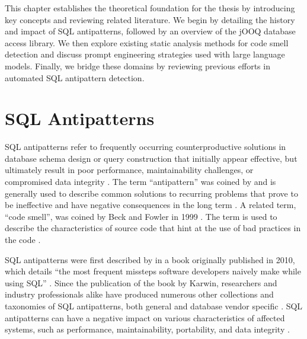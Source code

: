 This chapter establishes the theoretical foundation for the thesis by introducing key concepts and reviewing related literature. We begin by detailing the history and impact of SQL antipatterns, followed by an overview of the jOOQ database access library. We then explore existing static analysis methods for code smell detection and discuss prompt engineering strategies used with large language models. Finally, we bridge these domains by reviewing previous efforts in automated SQL antipattern detection.

\section{SQL Antipatterns}\label{sec:sqlAntipatterns}

SQL antipatterns refer to frequently occurring counterproductive solutions in database schema design or query construction that initially appear effective, but ultimately result in poor performance, maintainability challenges, or compromised data integrity \citetext{\citealp[p. 1]{karwin2023sql}; \citealp[p. 4]{alshemaimri2021survey}}. The term “antipattern” was coined by  and is generally used to describe common solutions to recurring problems that prove to be ineffective and have negative consequences in the long term \citetext{\citealp[p. 1]{karwin2023sql}; \citealp[p. 4]{ambler1998process}; \citealp[p. 6]{brown1998antipatterns}}. A related term, “code smell”, was coined by Beck and Fowler in 1999 . The term is used to describe the characteristics of source code that hint at the use of bad practices in the code .

SQL antipatterns were first described by  in a book originally published in 2010, which details “the most frequent missteps software developers naively make while using SQL” . Since the publication of the book by Karwin, researchers and industry professionals alike have produced numerous other collections and taxonomies of SQL antipatterns, both general  and database vendor specific . SQL antipatterns can have a negative impact on various characteristics of affected systems, such as performance, maintainability, portability, and data integrity .

